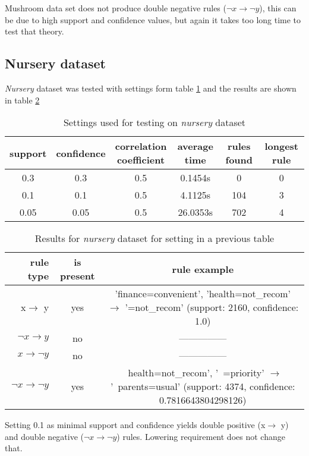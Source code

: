 \documentclass{article}
\begin{document}
	Mushroom data set does not produce double negative rules ($\neg x\rightarrow \neg y $), this can be due to high support and confidence values, but again it takes too long time to test that theory.
	
	\subsection{Nursery dataset}
	\textit{Nursery} dataset was tested with settings form table \ref{ns} and the results are shown in table \ref{nr}
	
	\begin{table}[H]
		\centering
		\caption{Settings used for testing on \textit{nursery} dataset}
		\label{ns}
		\begin{tabular}{c |c |c|c|c|c}
			support&confidence&\makecell{correlation\\coefficient}&average time&rules found&longest rule\\
			\hline
			\hline
			0.3&0.3&0.5&0.1454s&0&0\\
			\hline
			0.1&0.1&0.5&4.1125s&104&3\\
			\hline
			0.05&0.05&0.5&26.0353s&702&4\\
		\end{tabular}
	\end{table}
	\begin{table}[H]
		\centering
		\caption{Results for \textit{nursery} dataset for setting in a previous table}
		\label{nr}
		\begin{tabular}{r|c |c}
			rule type& is present & rule example\\
			\hline
			\hline
			x$\rightarrow$ y & yes &\makecell{'finance=convenient', 'health=not\_recom' $\rightarrow$\\ '=not\_recom'\\ (support: 2160, confidence: 1.0)} \\
			\hline
			$\neg x\rightarrow y$ & no &---------------\\
			\hline
			$x\rightarrow \neg y $& no &---------------\\
			\hline
			$\neg x\rightarrow \neg y $& yes &\makecell{~health=not\_recom', '~=priority' $\rightarrow$\\ '~parents=usual'\\ (support: 4374, confidence: 0.7816643804298126)} \\ 
		\end{tabular}
	\end{table}
	Setting 0.1 as minimal support and confidence yields double positive (x$\rightarrow$ y) and double negative ($\neg x\rightarrow \neg y $) rules. Lowering requirement does not change that.
	
\end{document}
